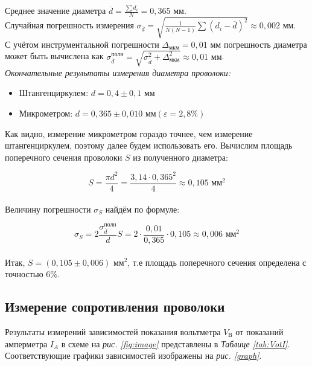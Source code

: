 \documentclass[a4paper,12pt]{article} %
\begin{document}
Среднее значение диаметра $ \overline{d} = \frac{\sum d_i}{N} = 0,365 \text{ мм}$.\\

Случайная погрешность измерения $ \sigma_{\overline{d}} = \sqrt{\frac{1}{N  (N-1)}\sum(d_i-\overline{d})^2} \approx 0,002 \text{ мм}$.\\

С учётом инструментальной погрешности $ \Delta_\text{мкм} = 0,01$ мм погрешность диаметра может быть вычислена как $ \sigma^{\text{полн}}_{\overline{d}} = \sqrt{\sigma^2_{\overline{d}} + \Delta^2_{\text{мкм}}} \approx 0,01 \text{ мм}$. \\

\textit{Окончательные результаты измерения диаметра проволоки:}

\begin{itemize}
	\item Штангенциркулем: $ d = 0,4 \pm 0,1 \text{ мм}  $
	\item Микрометром:  $ d = 0,365 \pm 0,010 \text{ мм} \left(\varepsilon = 2,8 \%\right)  $
\end{itemize}

Как видно, измерение микрометром гораздо точнее, чем измерение штангенциркулем, поэтому далее будем использовать его.
Вычислим площадь поперечного сечения проволоки $S$ из полученного диаметра:

\begin{equation}
S = \frac{\pi d^2}{4} = \frac{3,14 \cdot 0,365^2}{4} \approx 0,105 \text{ мм}^2
\end{equation}\\

Величину погрешности $\sigma_S$ найдём по формуле:

\begin{equation}
\sigma_S = 2\frac{\sigma^{\text{полн}}_{\overline{d}}}{d}S = 2 \cdot \frac{0,01}{0,365} \cdot 0,105  \approx 0,006 \text{ мм}^2
\end{equation}\\

Итак, $S = (0,105 \pm 0,006) \text{ мм}^2$, т.е площадь поперечного сечения определена с точностью $6 \%$.

\subsection{Измерение сопротивления проволоки}

Результаты измерений зависимостей показания вольтметра $ V_\text{В} $ от показаний амперметра $ I_A $ в схеме на \textit{рис.  \ref{fig:image}} представлены в \textit{Таблице \ref{tab:VotI}}. Соответствующие графики зависимостей изображены на \textit{рис. \ref{graph}}.\\
\end{document}
